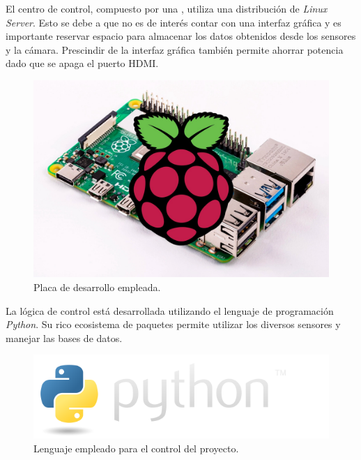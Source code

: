 El centro de control, compuesto por una \rspi, utiliza una distribución de \textit{Linux Server}. Esto se debe a que no es de interés contar con una interfaz gráfica y es importante reservar espacio para almacenar los datos obtenidos desde los sensores y la cámara. Prescindir de la interfaz gráfica también permite ahorrar potencia dado que se apaga el puerto HDMI.

\begin{figure}[H]
	\centering
	\includegraphics[width=0.7\linewidth]{"../Ingenieria de Detalle/ImagenesIngenieria de Detalle/rpi_with_board"}
	\caption{Placa de desarrollo empleada.}
	\label{fig:rpiwhiteboard}
\end{figure}

La lógica de control está desarrollada utilizando el lenguaje de programación \textit{Python}. Su rico ecosistema de paquetes permite utilizar los diversos sensores y manejar las bases de datos.

\begin{figure}[H]
	\centering
	\includegraphics[width=0.7\linewidth]{"../Ingenieria de Detalle/ImagenesIngenieria de Detalle/python-logo@2x"}
	\caption{Lenguaje empleado para el control del proyecto.}
	\label{fig:python-logo2x}
\end{figure}










